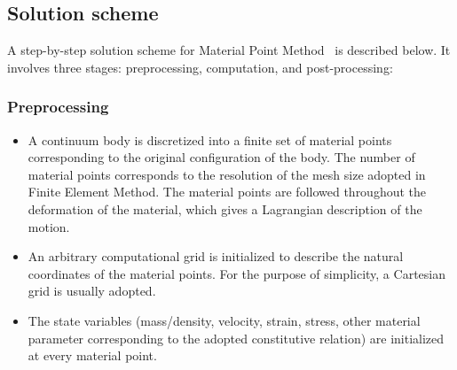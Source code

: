 \subsection{Solution scheme}
A step-by-step solution scheme for Material Point Method~\citep{Bandara2009} is 
described below. It involves three stages: preprocessing, computation, and 
post-processing: 
\subsubsection{Preprocessing}
\begin{itemize}
\item
A continuum body is discretized into a finite set of material points 
corresponding to the original configuration of the body. The number of material 
points corresponds to the resolution of the mesh size adopted in Finite Element 
Method. The material points are followed throughout the deformation of the 
material, which gives a Lagrangian description of the motion. 
\item
An arbitrary computational grid is initialized to describe the natural 
coordinates of the material points. For the purpose of simplicity, a Cartesian 
grid is usually adopted. 
\item
The state variables (mass/density, velocity, strain, stress, other material 
parameter corresponding to the adopted constitutive relation) are initialized 
at every material point. 
\end{itemize}

